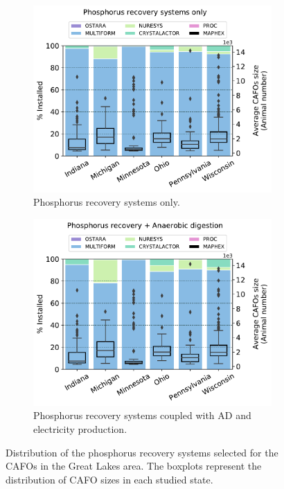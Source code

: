 \documentclass[authoryear]{elsarticle}
\begin{document}
\begin{figure}[h]
	\begin{subfigure}[t]{0.49\linewidth}
		\includegraphics[width=\linewidth]{TechsDistribution_Pcredits22_REC0.pdf} 
		\caption{Phosphorus recovery systems only.}
		\label{fig:PTechs_Distribution_NoAD}
	\end{subfigure}
	\quad
	\begin{subfigure}[t]{0.49\linewidth}
		\includegraphics[width=\linewidth]{TechsDistribution_Pcredits22_REC60.pdf}
		\caption{Phosphorus recovery systems coupled with AD and electricity production.}
		\label{fig:PTechs_Distribution_AD}
	\end{subfigure}
	
	\caption{Distribution of the phosphorus recovery systems selected for the CAFOs in the Great Lakes area. The boxplots represent the distribution of CAFO sizes in each studied state.}
	\label{fig:PTechs_Distribution}
\end{figure}
\end{document}

